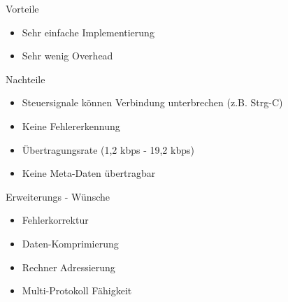 \documentclass[beamer]{uibk}
\begin{document}
\begin{frame}{}
    \begin{block}{Vorteile}
      \begin{itemize}
        \item Sehr einfache Implementierung
        \item Sehr wenig Overhead
      \end{itemize}
    \end{block}

    \begin{alertblock}{Nachteile}
      \begin{itemize}
        \item Steuersignale können Verbindung unterbrechen (z.B. Strg-C)
        \item Keine Fehlererkennung
        \item Übertragungsrate (1,2 kbps - 19,2 kbps)
        \item Keine Meta-Daten übertragbar
      \end{itemize}
    \end{alertblock}

\end{frame}

\begin{frame}{Erweiterungs - Wünsche}
  \begin{itemize}
    \item Fehlerkorrektur
    \item Daten-Komprimierung
    \item Rechner Adressierung
    \item Multi-Protokoll Fähigkeit
  \end{itemize}

\end{frame}
\end{document}
